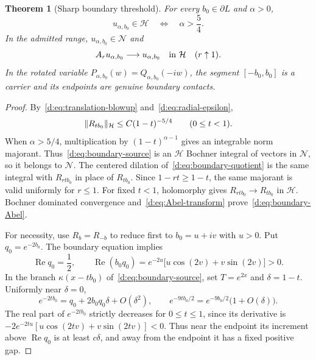 \documentclass[11pt,a4paper]{article}
\numberwithin{equation}{section}
\newtheorem{theorem}{Theorem}[section]
\theoremstyle{definition}\newtheorem{definition}[theorem]{Definition}
\theoremstyle{remark}\newtheorem{remark}[theorem]{Remark}
\newcommand{\Hh}{\mathcal H}\newcommand{\Hw}{\mathcal H}
\newcommand{\Nn}{\mathcal N}\newcommand{\Ii}{\mathcal I}\newcommand{\Zz}{\mathcal Z}
\begin{document}
\begin{theorem}[Sharp boundary threshold]\label{d:thm:boundary-family}
For every $b_0\in\partial L$ and $\alpha>0$,
\begin{equation}\label{d:eq:boundary-threshold}
 u_{\alpha,b_0}\in\Hh\quad\Longleftrightarrow\quad\alpha>\frac54.
\end{equation}
In the admitted range, $u_{\alpha,b_0}\in\Nn$ and
\begin{equation}\label{d:eq:boundary-Abel}
 A_ru_{\alpha,b_0}\longrightarrow u_{\alpha,b_0}
 \quad\hbox{in }\Hh\quad(r\uparrow1).
\end{equation}
In the rotated variable $P_{\alpha,b_0}(w)=Q_{\alpha,b_0}(-iw)$, the segment $[-b_0,b_0]$ is a carrier and its endpoints are genuine boundary contacts.
\end{theorem}
\begin{proof}
By~\eqref{d:eq:translation-blowup} and~\eqref{d:eq:radial-epsilon},
\begin{equation}\label{d:eq:boundary-majorant}
 \norm{R_{tb_0}}_{\Hh}\le C(1-t)^{-5/4}\qquad(0\le t<1).
\end{equation}
When $\alpha>5/4$, multiplication by $(1-t)^{\alpha-1}$ gives an integrable norm majorant. Thus~\eqref{d:eq:boundary-source} is an $\Hh$ Bochner integral of vectors in $\Nn$, so it belongs to $\Nn$. The centered dilation of~\eqref{d:eq:boundary-quotient} is the same integral with $R_{rtb_0}$ in place of $R_{tb_0}$. Since $1-rt\ge1-t$, the same majorant is valid uniformly for $r\le1$. For fixed $t<1$, holomorphy gives $R_{rtb_0}\to R_{tb_0}$ in $\Hh$. Bochner dominated convergence and~\eqref{d:eq:Abel-transform} prove~\eqref{d:eq:boundary-Abel}.

For necessity, use $R_b=R_{-b}$ to reduce first to $b_0=u+iv$ with $u>0$. Put $q_0=e^{-2b_0}$. The boundary equation implies
\begin{equation}\label{d:eq:boundary-q}
 \operatorname{Re}q_0=\frac12,\qquad
 \operatorname{Re}(b_0q_0)
 =e^{-2u}\bigl[u\cos(2v)+v\sin(2v)\bigr]>0.
\end{equation}
In the branch $\kappa(x-tb_0)$ of~\eqref{d:eq:boundary-source}, set $T=e^{2x}$ and $\delta=1-t$. Uniformly near $\delta=0$,
\[
 e^{-2tb_0}=q_0+2b_0q_0\delta+O(\delta^2),\qquad
 e^{-9tb_0/2}=e^{-9b_0/2}\bigl(1+O(\delta)\bigr).
\]
The real part of $e^{-2tb_0}$ strictly decreases for $0\le t\le1$, since its derivative is
$-2e^{-2tu}[u\cos(2tv)+v\sin(2tv)]<0$.
Thus near the endpoint its increment above $\operatorname{Re}q_0$ is at least $c\delta$, and away from the endpoint it has a fixed positive gap.


\end{proof}
\end{document}
